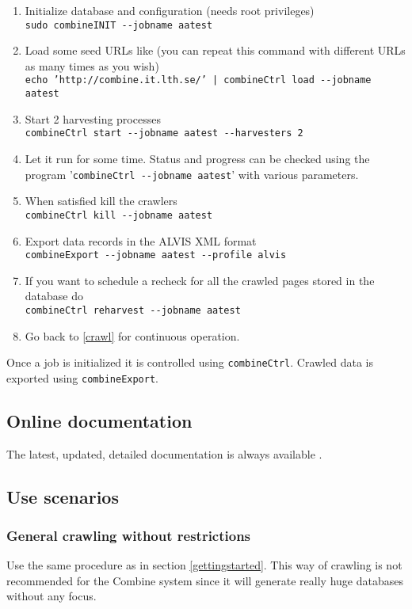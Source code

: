 \begin{enumerate}
\item    Initialize database and configuration (needs root privileges)\\
{\tt  sudo combineINIT \verb+--+jobname aatest}
\item \label{load} Load some seed URLs like (you can repeat this command with different URLs as many times as you wish)\\
{\tt  echo 'http://combine.it.lth.se/' | combineCtrl  load \verb+--+jobname aatest}
\item \label{crawl}   Start 2 harvesting processes\\
{\tt  combineCtrl  start \verb+--+jobname aatest \verb+--+harvesters 2}

\item Let it run for some time. Status and progress can be checked using
the program '{\tt combineCtrl \verb+--+jobname aatest}'
with various parameters.

\item    When satisfied kill the crawlers\\
{\tt  combineCtrl kill \verb+--+jobname aatest}
\item    Export data records in the ALVIS XML format\\
{\tt  combineExport \verb+--+jobname aatest \verb+--+profile alvis}

\item If you want to schedule a recheck for all the crawled pages stored in the database do\\
{\tt combineCtrl reharvest \verb+--+jobname aatest}
\item Go back to \ref{crawl} for continuous operation.
\end{enumerate}

Once a job is initialized it is controlled using
{\tt combineCtrl}. Crawled data is exported using {\tt combineExport}.

\subsection{Online documentation}
The latest, updated, detailed documentation is always available
.

\subsection{Use scenarios}
\subsubsection{General crawling without restrictions}
Use the same procedure as in section \ref{gettingstarted}. This way of
crawling is not recommended for the Combine system since it will
generate really huge databases without any focus.

